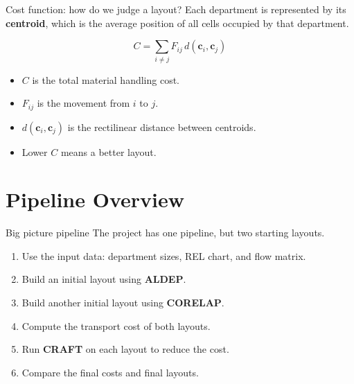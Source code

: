 \documentclass[aspectratio=169,10pt]{beamer}
\begin{document}
\begin{frame}[t]{Cost function: how do we judge a layout?}
  \RaggedRight
  \small
  Each department is represented by its \textbf{centroid}, which is the average position
  of all cells occupied by that department.

  \vspace{0.55em}
  \[
    C = \sum_{i\neq j} F_{ij}\, d(\mathbf{c}_i,\mathbf{c}_j)
  \]

  \vspace{0.25em}
  \begin{itemize}
    \setlength{\itemsep}{0.35em}
    \item $C$ is the total material handling cost.
    \item $F_{ij}$ is the movement from $i$ to $j$.
    \item $d(\mathbf{c}_i,\mathbf{c}_j)$ is the rectilinear distance between centroids.
    \item Lower $C$ means a better layout.
  \end{itemize}
\end{frame}

\section{Pipeline Overview}

\begin{frame}[t]{Big picture pipeline}
  \RaggedRight
  \small
  The project has one pipeline, but two starting layouts.

  \vspace{0.55em}
  \begin{enumerate}
    \setlength{\itemsep}{0.4em}
    \item Use the input data: department sizes, REL chart, and flow matrix.
    \item Build an initial layout using \textbf{ALDEP}.
    \item Build another initial layout using \textbf{CORELAP}.
    \item Compute the transport cost of both layouts.
    \item Run \textbf{CRAFT} on each layout to reduce the cost.
    \item Compare the final costs and final layouts.
  \end{enumerate}
\end{frame}
\end{document}
